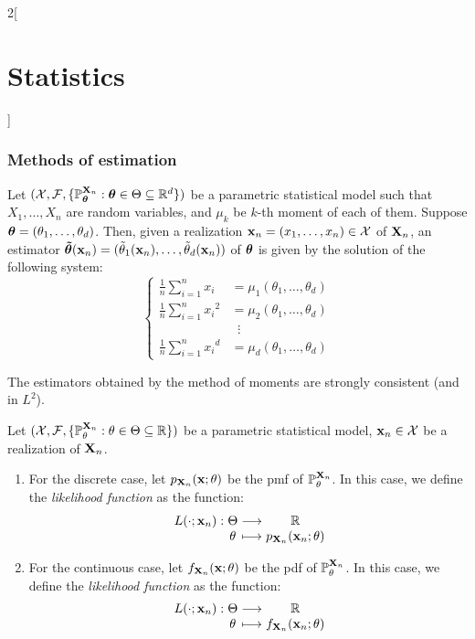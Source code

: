 \documentclass[../../../main.tex]{subfiles}
\begin{document}
\begin{multicols}{2}[\section{Statistics}]
  \subsubsection{Methods of estimation}
  \begin{definition}
    Let $(\mathcal{X},\mathcal{F},\{\mathbb{P}_{\boldsymbol{\mathrm{\theta}}}^{\boldsymbol{\mathrm{X}}_n}:\boldsymbol{\mathrm{\theta}}\in\Theta\subseteq \mathbb{R}^d\})$ be a parametric statistical model such that $X_1,\ldots,X_n$ are \iid random variables, and $\mu_k$ be $k$-th moment of each of them. Suppose $\boldsymbol{\mathrm{\theta}}=(\theta_1,\ldots,\theta_d)$. Then, given a realization $\boldsymbol{\mathrm{x}}_n=(x_1,\ldots,x_n)\in\mathcal{X}$ of $\boldsymbol{\mathrm{X}}_n$, an estimator $\boldsymbol{\mathrm{\tilde{\theta}}}(\boldsymbol{\mathrm{x}}_n)=(\tilde{\theta}_1(\boldsymbol{\mathrm{x}}_n),\ldots,\tilde{\theta}_d(\boldsymbol{\mathrm{x}}_n))$ of $\boldsymbol{\mathrm{\theta}}$ is given by the solution of the following system:
    $$
      \left\{
      \begin{aligned}
        \frac{1}{n}\sum_{i=1}^nx_i     & =\mu_1(\theta_1,\ldots,\theta_d) \\
        \frac{1}{n}\sum_{i=1}^n{x_i}^2 & =\mu_2(\theta_1,\ldots,\theta_d) \\
                                       & \;\;\vdots                       \\
        \frac{1}{n}\sum_{i=1}^n{x_i}^d & =\mu_d(\theta_1,\ldots,\theta_d)
      \end{aligned}
      \right.
    $$
  \end{definition}
  \begin{proposition}
    The estimators obtained by the method of moments are strongly consistent (and in $L^2$).
  \end{proposition}
  \begin{definition}[Likelihood]
    Let $(\mathcal{X},\mathcal{F},\{\mathbb{P}_{\theta}^{\boldsymbol{\mathrm{X}}_n}:{\theta}\in\Theta\subseteq \mathbb{R}\})$ be a parametric statistical model, $\boldsymbol{\mathrm{x}}_n\in\mathcal{X}$ be a realization of $\boldsymbol{\mathrm{X}}_n$.
    \begin{enumerate}
      \item For the discrete case, let $p_{\boldsymbol{\mathrm{X}}_n}(\boldsymbol{\mathrm{x}};\theta)$ be the pmf of $\mathbb{P}_{\theta}^{\boldsymbol{\mathrm{X}}_n}$. In this case, we define the \emph{likelihood function} as the function:
            $$\function{L(\cdot;\vf{x}_n)}{\Theta}{\RR}{\theta}{p_{\vf{X}_n}(\vf{x}_n;\theta)}$$
      \item For the continuous case, let $f_{\boldsymbol{\mathrm{X}}_n}(\boldsymbol{\mathrm{x}};\theta)$ be the pdf of $\mathbb{P}_{\theta}^{\boldsymbol{\mathrm{X}}_n}$. In this case, we define the \emph{likelihood function} as the function:
            $$\function{L(\cdot;\vf{x}_n)}{\Theta}{\RR}{\theta}{f_{\vf{X}_n}(\vf{x}_n;\theta)}$$

\end{enumerate}
\end{definition}
\end{multicols}
\end{document}
